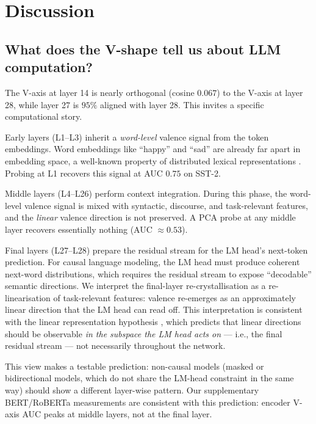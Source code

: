 \section{Discussion}
\label{sec:discussion}

\subsection{What does the V-shape tell us about LLM computation?}

The V-axis at layer 14 is nearly orthogonal (cosine $0.067$) to the
V-axis at layer 28, while layer 27 is $95\%$ aligned with layer 28.
This invites a specific computational story.

Early layers (L1--L3) inherit a \emph{word-level} valence signal from the
token embeddings. Word embeddings like ``happy'' and ``sad'' are already
far apart in embedding space, a well-known property of distributed lexical
representations \cite{mikolov2013linguistic, bolukbasi2016man}. Probing at
L1 recovers this signal at AUC $0.75$ on SST-2.

Middle layers (L4--L26) perform context integration. During this phase, the
word-level valence signal is mixed with syntactic, discourse, and task-relevant
features, and the \emph{linear} valence direction is not preserved. A PCA
probe at any middle layer recovers essentially nothing (AUC $\approx 0.53$).

Final layers (L27--L28) prepare the residual stream for the LM head's
next-token prediction. For causal language modeling, the LM head must
produce coherent next-word distributions, which requires the residual stream
to expose ``decodable'' semantic directions. We interpret the final-layer
re-crystallisation as a re-linearisation of task-relevant features: valence
re-emerges as an approximately linear direction that the LM head can read
off. This interpretation is consistent with the linear representation
hypothesis \cite{park2024linear}, which predicts that linear directions
should be observable \emph{in the subspace the LM head acts on} --- i.e.,
the final residual stream --- not necessarily throughout the network.

This view makes a testable prediction: non-causal models
(masked or bidirectional models, which do not share the LM-head constraint
in the same way) should show a different layer-wise pattern. Our
supplementary BERT/RoBERTa measurements are consistent with this
prediction: encoder V-axis AUC peaks at middle layers, not at the final
layer.

